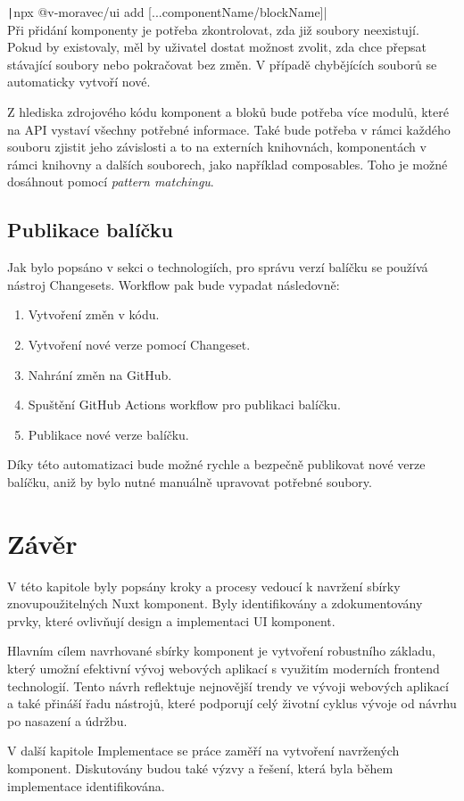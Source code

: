 \texttt|npx @v-moravec/ui add [...componentName/blockName]|\\

Při přidání komponenty je potřeba zkontrolovat, zda již soubory neexistují. Pokud by existovaly, měl by uživatel dostat možnost zvolit, zda chce přepsat stávající soubory nebo pokračovat bez změn. V případě chybějících souborů se automaticky vytvoří nové.

Z hlediska zdrojového kódu komponent a bloků bude potřeba více modulů, které na API vystaví všechny potřebné informace. Také bude potřeba v rámci každého souboru zjistit jeho závislosti a to na externích knihovnách, komponentách v rámci knihovny a dalších souborech, jako například composables. Toho je možné dosáhnout pomocí \emph{pattern matchingu}.

\subsection{Publikace balíčku}
Jak bylo popsáno v sekci o technologiích, pro správu verzí balíčku se používá nástroj Changesets. Workflow pak bude vypadat následovně:

\begin{enumerate}
  \item Vytvoření změn v kódu.
  \item Vytvoření nové verze pomocí Changeset.
  \item Nahrání změn na GitHub.
  \item Spuštění GitHub Actions workflow pro publikaci balíčku.
  \item Publikace nové verze balíčku.
\end{enumerate}

Díky této automatizaci bude možné rychle a bezpečně publikovat nové verze balíčku, aniž by bylo nutné manuálně upravovat potřebné soubory.

\section{Závěr}
V této kapitole byly popsány kroky a procesy vedoucí k navržení sbírky znovupoužitelných Nuxt komponent. Byly identifikovány a zdokumentovány prvky, které ovlivňují design a implementaci UI komponent.

Hlavním cílem navrhované sbírky komponent je vytvoření robustního základu, který umožní efektivní vývoj webových aplikací s využitím moderních frontend technologií. Tento návrh reflektuje nejnovější trendy ve vývoji webových aplikací a také přináší řadu nástrojů, které podporují celý životní cyklus vývoje od návrhu po nasazení a údržbu.

V další kapitole Implementace se práce zaměří na vytvoření navržených komponent. Diskutovány budou také výzvy a řešení, která byla během implementace identifikována.


